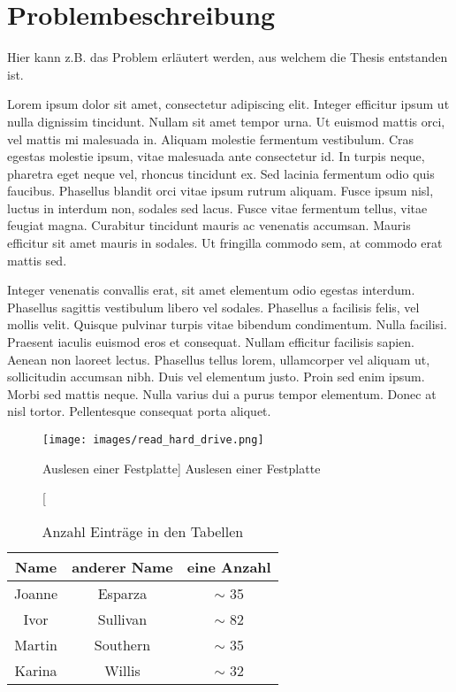 \section{Problembeschreibung}

Hier kann z.B. das Problem erläutert werden, aus welchem die Thesis entstanden ist.

Lorem ipsum dolor sit amet, consectetur adipiscing elit. Integer efficitur ipsum ut nulla dignissim tincidunt. Nullam sit amet tempor urna. Ut euismod mattis orci, vel mattis mi malesuada in. Aliquam molestie fermentum vestibulum. Cras egestas molestie ipsum, vitae malesuada ante consectetur id. In turpis neque, pharetra eget neque vel, rhoncus tincidunt ex. Sed lacinia fermentum odio quis faucibus. Phasellus blandit orci vitae ipsum rutrum aliquam. Fusce ipsum nisl, luctus in interdum non, sodales sed lacus. Fusce vitae fermentum tellus, vitae feugiat magna. Curabitur tincidunt mauris ac venenatis accumsan. Mauris efficitur sit amet mauris in sodales. Ut fringilla commodo sem, at commodo erat mattis sed.

Integer venenatis convallis erat, sit amet elementum odio egestas interdum. Phasellus sagittis vestibulum libero vel sodales. Phasellus a facilisis felis, vel mollis velit. Quisque pulvinar turpis vitae bibendum condimentum. Nulla facilisi. Praesent iaculis euismod eros et consequat. Nullam efficitur facilisis sapien. Aenean non laoreet lectus. Phasellus tellus lorem, ullamcorper vel aliquam ut, sollicitudin accumsan nibh. Duis vel elementum justo. Proin sed enim ipsum. Morbi sed mattis neque. Nulla varius dui a purus tempor elementum. Donec at nisl tortor. Pellentesque consequat porta aliquet. 

\clearpage

\begin{figure}[ht]
    \centering
    \texttt{[image: images/read\_hard\_drive.png]} %
    \caption
    [Auslesen einer Festplatte] %
    {Auslesen einer Festplatte\cite{quelle}} %
    \label{fig:old_db}
\end{figure}

\begin{wraptable}[9]{r}{8cm} 
\begin{center}
\begin{tabular}{||c c c||} 
    \hline
    Name & anderer Name & eine Anzahl \\ [0.5ex] 
    \hline\hline
    Joanne &
    Esparza &
    $\sim$ 35 \\
    \hline
    Ivor &
    Sullivan &
    $\sim$ 82 \\ 
    \hline
    Martin & 
    Southern &
    $\sim$ 35 \\
    \hline
    Karina & 
    Willis &
    $\sim$ 32 \\
    \hline
\end{tabular}
\end{center}
\caption{Anzahl Einträge in den Tabellen}
\label{tab:bsp_tabelle}
\end{wraptable} 

